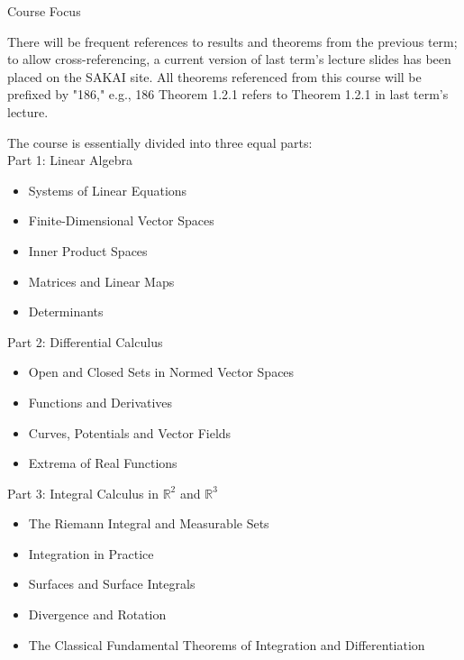\documentclass[smaller,hyperref={CJKbookmarks=true}]{beamer}
\begin{document}
\begin{frame}{Course Focus} \begin{spacing}{1.1}
There will be frequent references to results and theorems from the
previous term; to allow cross-referencing, a current version of last term's
lecture slides has been placed on the SAKAI site. All theorems referenced
from this course will be prefixed by "186," e.g., 186 Theorem 1.2.1 refers
to Theorem 1.2.1 in last term's lecture.\end{spacing} \vspace*{12pt}
The course is essentially divided into three equal parts:\\[11pt]
\alert{\Large{Part 1: Linear Algebra}}
\begin{itemize}
  \item Systems of Linear Equations
  \item Finite-Dimensional Vector Spaces
  \item Inner Product Spaces
  \item Matrices and Linear Maps
  \item Determinants
\end{itemize}
\alert{\Large{Part 2: Dif{}ferential Calculus}}
\begin{itemize}
  \item Open and Closed Sets in Normed Vector Spaces
  \item Functions and Derivatives
  \item Curves, Potentials and Vector Fields
  \item Extrema of Real Functions
\end{itemize}
\alert{\Large{Part 3: Integral Calculus in $\mathbb{R}^2$ and $\mathbb{R}^3$}}
\begin{itemize}
  \item The Riemann Integral and Measurable Sets
  \item Integration in Practice
  \item Surfaces and Surface Integrals
  \item Divergence and Rotation
  \item The Classical Fundamental Theorems of Integration and
Dif{}ferentiation
\end{itemize}
\end{frame}
\end{document}
